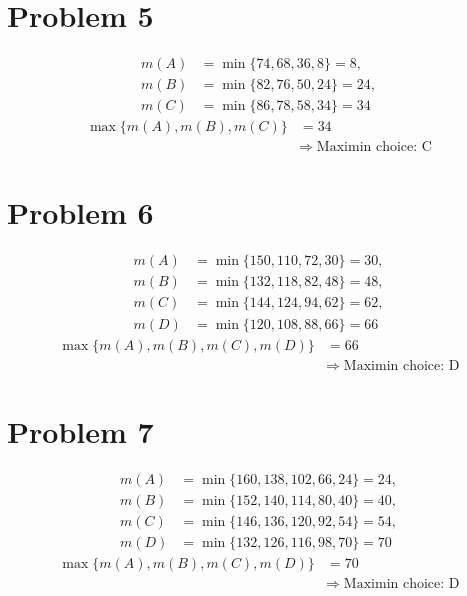\section*{Problem 5}
\[
	\begin{aligned}
	m(A) &= \min\{74,68,36,8\}=8,\\
	m(B) &= \min\{82,76,50,24\}=24,\\
	m(C) &= \min\{86,78,58,34\}=34
	\end{aligned}
	\]
	\[
	\begin{aligned}
	\max\{m(A),m(B),m(C)\} &= 34\\
	&\Rightarrow\;\text{Maximin choice: C}
	\end{aligned}
	\]

\section*{Problem 6}
\[
	\begin{aligned}
	m(A) &= \min\{150,110,72,30\}=30,\\
	m(B) &= \min\{132,118,82,48\}=48,\\
	m(C) &= \min\{144,124,94,62\}=62,\\
	m(D) &= \min\{120,108,88,66\}=66
	\end{aligned}
	\]
	\[
	\begin{aligned}
	\max\{m(A),m(B),m(C),m(D)\} &= 66\\
	&\Rightarrow\;\text{Maximin choice: D}
	\end{aligned}
	\]

\section*{Problem 7}
\[
	\begin{aligned}
	m(A) &= \min\{160,138,102,66,24\}=24,\\
	m(B) &= \min\{152,140,114,80,40\}=40,\\
	m(C) &= \min\{146,136,120,92,54\}=54,\\
	m(D) &= \min\{132,126,116,98,70\}=70
	\end{aligned}
	\]
	\[
	\begin{aligned}
	\max\{m(A),m(B),m(C),m(D)\} &= 70\\
	&\Rightarrow\;\text{Maximin choice: D}
	\end{aligned}
	\]

